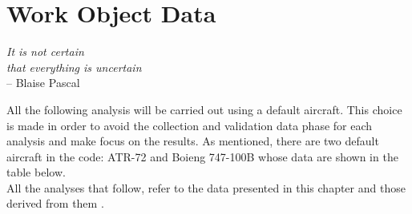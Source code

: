 \chapter{Work Object Data}
\label{ch:workobject}

\begin{flushright}
	{\smaller
		\textit{It is not certain\\ that everything is uncertain}\\
		-- Blaise Pascal}
\end{flushright}

All the following analysis will be carried out using a default aircraft. This choice is made in order to avoid the collection and validation data phase for each analysis and make focus on the results. As mentioned, there are two default aircraft in the code: ATR-72 and Boieng 747-100B whose data are shown in the table below.\\
All the analyses that follow, refer to the data presented in this chapter and those derived from them .



